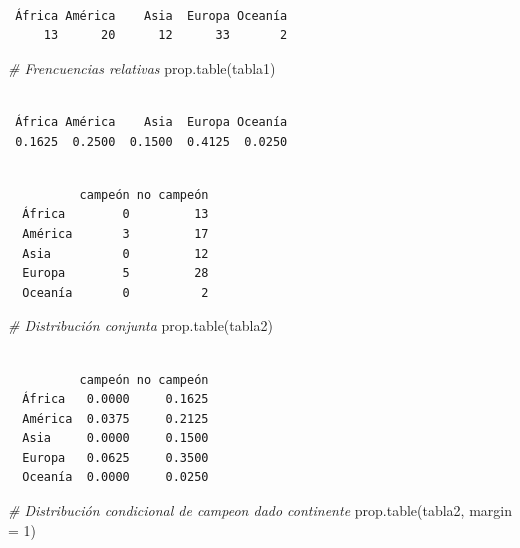 \documentclass[
]{book}
\newenvironment{Shaded}{\begin{snugshade}}{\end{snugshade}}
\newcommand{\AttributeTok}[1]{\textcolor[rgb]{0.77,0.63,0.00}{#1}}
\newcommand{\CommentTok}[1]{\textcolor[rgb]{0.56,0.35,0.01}{\textit{#1}}}
\newcommand{\DecValTok}[1]{\textcolor[rgb]{0.00,0.00,0.81}{#1}}
\newcommand{\FunctionTok}[1]{\textcolor[rgb]{0.00,0.00,0.00}{#1}}
\newcommand{\NormalTok}[1]{#1}
\newcommand{\OtherTok}[1]{\textcolor[rgb]{0.56,0.35,0.01}{#1}}
\newcommand{\SpecialCharTok}[1]{\textcolor[rgb]{0.00,0.00,0.00}{#1}}
\begin{document}
\begin{verbatim}

 África América    Asia  Europa Oceanía 
     13      20      12      33       2 
\end{verbatim}

\begin{Shaded}
\begin{Highlighting}[]
\CommentTok{\# Frencuencias relativas}
\FunctionTok{prop.table}\NormalTok{(tabla1)}
\end{Highlighting}
\end{Shaded}

\begin{verbatim}

 África América    Asia  Europa Oceanía 
 0.1625  0.2500  0.1500  0.4125  0.0250 
\end{verbatim}

\begin{Shaded}
\end{Shaded}

\begin{verbatim}
         
          campeón no campeón
  África        0         13
  América       3         17
  Asia          0         12
  Europa        5         28
  Oceanía       0          2
\end{verbatim}

\begin{Shaded}
\begin{Highlighting}[]
\CommentTok{\# Distribución conjunta}
\FunctionTok{prop.table}\NormalTok{(tabla2)}
\end{Highlighting}
\end{Shaded}

\begin{verbatim}
         
          campeón no campeón
  África   0.0000     0.1625
  América  0.0375     0.2125
  Asia     0.0000     0.1500
  Europa   0.0625     0.3500
  Oceanía  0.0000     0.0250
\end{verbatim}

\begin{Shaded}
\begin{Highlighting}[]
\CommentTok{\# Distribución condicional de campeon dado continente}
\FunctionTok{prop.table}\NormalTok{(tabla2, }\AttributeTok{margin =} \DecValTok{1}\NormalTok{)}
\end{Highlighting}
\end{Shaded}
\end{document}

